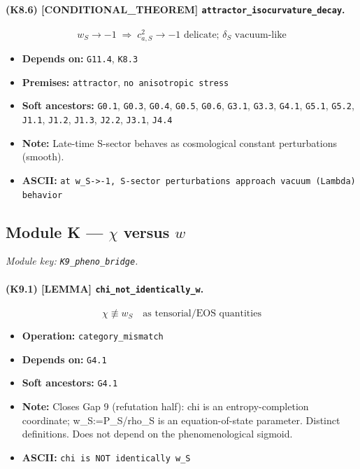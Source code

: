 \documentclass[11pt,a4paper]{article}
\theoremstyle{remark}\newtheorem*{caution}{Caution}
\newcommand{\tagbox}[1]{\textsc{[#1]}}
\begin{document}
\paragraph{(K8.6) \tagbox{CONDITIONAL\_THEOREM} \texttt{attractor\_isocurvature\_decay}.}
\begin{equation}
w_S\to -1\;\Rightarrow\; c_{a,S}^2\to -1\text{ delicate; }\delta_S\text{ vacuum-like}
\tag{K8.6}
\end{equation}
\begin{itemize}\setlength{\itemsep}{0.12em}
\item \textbf{Depends on:} \texttt{G11.4}, \texttt{K8.3}
\item \textbf{Premises:} \texttt{attractor}, \texttt{no anisotropic stress}
\item \textbf{Soft ancestors:} \texttt{G0.1}, \texttt{G0.3}, \texttt{G0.4}, \texttt{G0.5}, \texttt{G0.6}, \texttt{G3.1}, \texttt{G3.3}, \texttt{G4.1}, \texttt{G5.1}, \texttt{G5.2}, \texttt{J1.1}, \texttt{J1.2}, \texttt{J1.3}, \texttt{J2.2}, \texttt{J3.1}, \texttt{J4.4}
\item \textbf{Note:} Late-time S-sector behaves as cosmological constant perturbations (smooth).
\item \textbf{ASCII:} \texttt{at w\_S->-1, S-sector perturbations approach vacuum (Lambda) behavior}
\end{itemize}
\subsection{Module K --- $\chi$ versus $w$}
\textit{Module key: \texttt{K9\_pheno\_bridge}.}
\paragraph{(K9.1) \tagbox{LEMMA} \texttt{chi\_not\_identically\_w}.}
\begin{equation}
\chi\not\equiv w_S\quad\text{as tensorial/EOS quantities}
\tag{K9.1}
\end{equation}
\begin{itemize}\setlength{\itemsep}{0.12em}
\item \textbf{Operation:} \texttt{category\_mismatch}
\item \textbf{Depends on:} \texttt{G4.1}
\item \textbf{Soft ancestors:} \texttt{G4.1}
\item \textbf{Note:} Closes Gap 9 (refutation half): chi is an entropy-completion coordinate; w\_S:=P\_S/rho\_S is an equation-of-state parameter. Distinct definitions. Does not depend on the phenomenological sigmoid.
\item \textbf{ASCII:} \texttt{chi is NOT identically w\_S}
\end{itemize}
\end{document}
